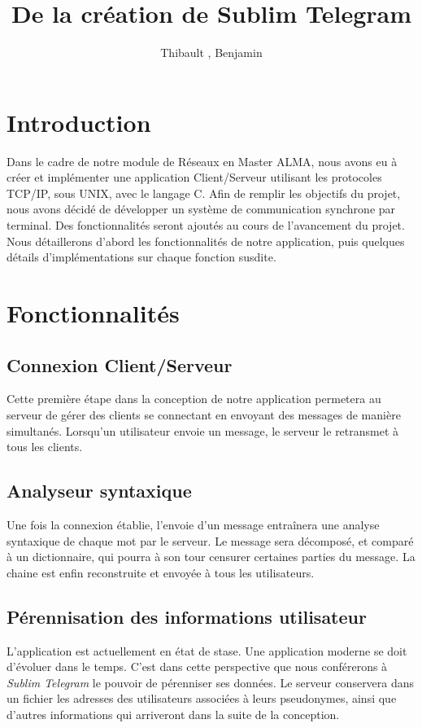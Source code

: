 \documentclass[a4paper, 12pt]{article}
\author{Thibault \bsc{Béziers la Fosse}, Benjamin \bsc{Moreau}}
\title{De la création de Sublim Telegram}
\begin{document}
\maketitle
\clearpage
\tableofcontents
\clearpage

\section{Introduction}
Dans le cadre de notre module de Réseaux en Master ALMA, nous avons eu à créer et implémenter une application Client/Serveur utilisant les protocoles TCP/IP, sous UNIX, avec le langage C. 
Afin de remplir les objectifs du projet, nous avons décidé de développer un système de communication synchrone par terminal. Des fonctionnalités seront ajoutés au cours de l'avancement du projet. 
Nous détaillerons d'abord les fonctionnalités de notre application, puis quelques détails d'implémentations sur chaque fonction susdite. 
\section{Fonctionnalités}
\subsection{Connexion Client/Serveur}
Cette première étape dans la conception de notre application permetera au serveur de gérer des clients se connectant en envoyant des messages de manière simultanés. Lorsqu'un utilisateur envoie un message, le serveur le retransmet à tous les clients.
\subsection{Analyseur syntaxique}
Une fois la connexion établie, l'envoie d'un message entraînera une analyse syntaxique de chaque mot par le serveur. Le message sera décomposé, et comparé à un dictionnaire, qui pourra à son tour censurer certaines parties du message. La chaine est enfin reconstruite et envoyée à tous les utilisateurs.  
\subsection{Pérennisation des informations utilisateur}
L'application est actuellement en état de stase. Une application moderne se doit d'évoluer dans le temps. C'est dans cette perspective que nous conférerons à \emph{Sublim Telegram} le pouvoir de pérenniser ses données. Le serveur conservera dans un fichier les adresses des utilisateurs associées à leurs pseudonymes, ainsi que d'autres informations qui arriveront dans la suite de la conception. 
\end{document}

